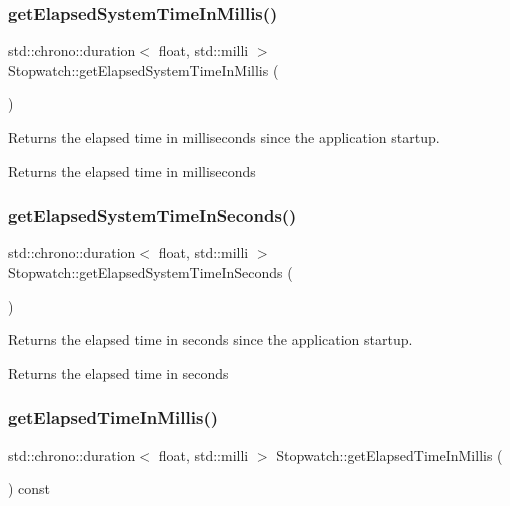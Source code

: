 \subsubsection{\texorpdfstring{getElapsedSystemTimeInMillis()}{getElapsedSystemTimeInMillis()}}
{\footnotesize\ttfamily std\+::chrono\+::duration$<$ float, std\+::milli $>$ Stopwatch\+::get\+Elapsed\+System\+Time\+In\+Millis (\begin{DoxyParamCaption}{ }\end{DoxyParamCaption})\hspace{0.3cm}{\ttfamily [static]}}



Returns the elapsed time in milliseconds since the application startup. 

\begin{DoxyReturn}{Returns}
the elapsed time in milliseconds 
\end{DoxyReturn}
\mbox{\label{class_stopwatch_a15494cf73d00c146c5151e348d9a5326}} 
\subsubsection{\texorpdfstring{getElapsedSystemTimeInSeconds()}{getElapsedSystemTimeInSeconds()}}
{\footnotesize\ttfamily std\+::chrono\+::duration$<$ float, std\+::milli $>$ Stopwatch\+::get\+Elapsed\+System\+Time\+In\+Seconds (\begin{DoxyParamCaption}{ }\end{DoxyParamCaption})\hspace{0.3cm}{\ttfamily [static]}}



Returns the elapsed time in seconds since the application startup. 

\begin{DoxyReturn}{Returns}
the elapsed time in seconds 
\end{DoxyReturn}
\mbox{\label{class_stopwatch_a5d69cdef517efa260d22218ffc2646d3}} 
\subsubsection{\texorpdfstring{getElapsedTimeInMillis()}{getElapsedTimeInMillis()}}
{\footnotesize\ttfamily std\+::chrono\+::duration$<$ float, std\+::milli $>$ Stopwatch\+::get\+Elapsed\+Time\+In\+Millis (\begin{DoxyParamCaption}{ }\end{DoxyParamCaption}) const}



